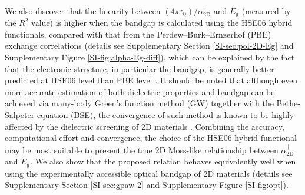 \documentclass[journal=ancac3,manuscript=article,email=true,hyperref=true,keywords=false]{achemso}
\begin{document}
We also discover that the linearity between
$(4 \pi \varepsilon_{0})/\alpha_{\mathrm{2D}}^{\parallel}$ and
$E_{\mathrm{g}}$ (measured by the $R^{2}$ value) is higher when the
bandgap is calculated using the HSE06 hybrid functionals, compared
with that from the Perdew--Burk--Ernzerhof (PBE) exchange correlations
(details see Supplementary Section \ref{SI-sec:pol-2D-Eg} and
Supplementary Figure \ref{SI-fig:alpha-Eg-diff}), which can be
explained by the fact that the electronic structure, in particular the
bandgap, is generally better predicted at HSE06 level than PBE level
\cite{Heyd_2005}. It should be noted that although even more accurate
estimation of both dielectric properties and bandgap can be achieved
via many-body Green’s function method (GW) together with the
Bethe-Salpeter equation (BSE), the convergence of such method is known
to be highly affected by the dielectric screening of 2D materials
\cite{Hueser_2013_2Dvs3D}. Combining the accuracy, computational
effort and convergence, the choice of the HSE06 hybrid functional may
be most suitable to present the true 2D Moss-like relationship between
$\alpha_{\mathrm{2D}}^{\parallel}$ and $E_{\mathrm{g}}$. We also show
that the proposed relation behaves equivalently well when using the
experimentally accessible optical bandgap of 2D materials (details see
Supplementary Section \ref{SI-sec:gpaw-2} and Supplementary Figure
\ref{SI-fig:opt}).
\end{document}
